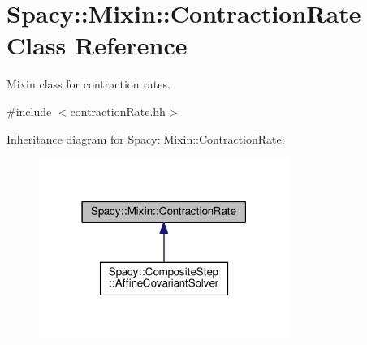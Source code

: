 \hypertarget{classSpacy_1_1Mixin_1_1ContractionRate}{}\section{Spacy\+:\+:Mixin\+:\+:Contraction\+Rate Class Reference}
\label{classSpacy_1_1Mixin_1_1ContractionRate}


Mixin class for contraction rates.  




{\ttfamily \#include $<$contraction\+Rate.\+hh$>$}



Inheritance diagram for Spacy\+:\+:Mixin\+:\+:Contraction\+Rate\+:
\nopagebreak
\begin{figure}[H]
\begin{center}
\leavevmode
\includegraphics[width=231pt]{classSpacy_1_1Mixin_1_1ContractionRate__inherit__graph}
\end{center}
\end{figure}
